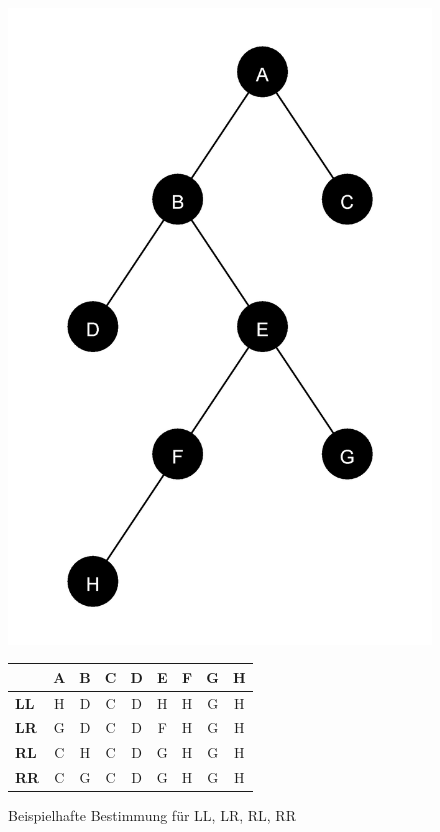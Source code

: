 \begin{figure}[ht]
    \centering
    \begin{minipage}[]{0.3\linewidth}
        \centering
        \includegraphics[scale=0.07]{abbildungen/tree_beispiel_LL_LR_RL_RR}
    \end{minipage}
    \hfill
    \begin{minipage}[]{0.65\linewidth}
        \centering
        \begin{tabular}{l | c | c | c | c | c | c | c | c}
            & A & B & C & D & E & F & G & H \\
            \hline\hline
            \textbf{LL} & H & D & C & D & H & H & G & H \\
            \textbf{LR} & G & D & C & D & F & H & G & H \\
            \textbf{RL} & C & H & C & D & G & H & G & H \\
            \textbf{RR} & C & G & C & D & G & H & G & H \\
            \end{tabular}
    \end{minipage} 
    \caption{Beispielhafte Bestimmung für LL, LR, RL, RR}
\end{figure}

